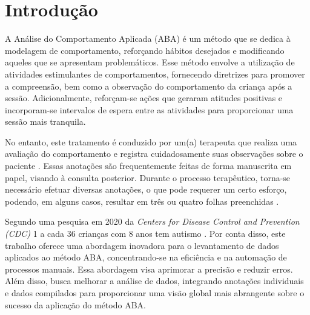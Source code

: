 
\chapter{Introdução}\label{intro}
A Análise do Comportamento Aplicada (ABA) é um método que se dedica à modelagem de comportamento, 
reforçando hábitos desejados e modificando aqueles que se apresentam problemáticos. Esse método 
envolve a utilização de atividades estimulantes de comportamentos, fornecendo diretrizes para promover 
a compreensão, bem como a observação do comportamento da criança após a sessão. Adicionalmente, 
reforçam-se ações que geraram atitudes positivas e incorporam-se intervalos de espera entre as 
atividades para proporcionar uma sessão mais tranquila.

No entanto, este tratamento é conduzido por um(a) terapeuta que realiza uma avaliação do comportamento 
e registra cuidadosamente suas observações sobre o paciente \cite{artoni2018technology}. Essas 
anotações são frequentemente feitas de forma manuscrita em papel, visando à consulta posterior. 
Durante o processo terapêutico, torna-se necessário efetuar diversas anotações, o que pode 
requerer um certo esforço, podendo, em alguns casos, resultar em três ou quatro folhas preenchidas 
\cite{artoni2013portable}.

Segundo uma pesquisa em 2020 da \textit{Centers for Disease Control and Prevention (CDC)} 1 
a cada 36 crianças com 8 anos tem autismo \cite{fitch2023cdc}. Por conta disso, este trabalho 
oferece uma abordagem inovadora para o levantamento de dados aplicados ao método ABA, concentrando-se 
na eficiência e na automação de processos manuais. Essa abordagem visa aprimorar a precisão e reduzir 
erros. Além disso, busca melhorar a análise de dados, integrando anotações individuais e dados compilados 
para proporcionar uma visão global mais abrangente sobre o sucesso da aplicação do método ABA.


